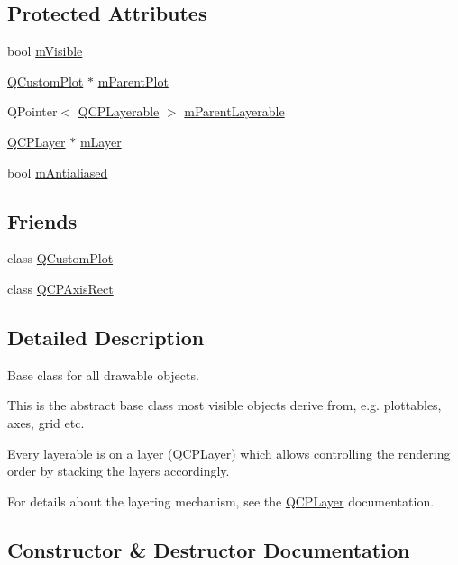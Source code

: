 \subsection*{Protected Attributes}
\begin{DoxyCompactItemize}
\item 
bool \hyperlink{classQCPLayerable_a62e3aed8427d6ce3ccf716f285106cb3}{m\+Visible}
\item 
\hyperlink{classQCustomPlot}{Q\+Custom\+Plot} $\ast$ \hyperlink{classQCPLayerable_aa2a528433e44db02b8aef23c1f9f90ed}{m\+Parent\+Plot}
\item 
Q\+Pointer$<$ \hyperlink{classQCPLayerable}{Q\+C\+P\+Layerable} $>$ \hyperlink{classQCPLayerable_a3291445a980053e2d17a21d15957624e}{m\+Parent\+Layerable}
\item 
\hyperlink{classQCPLayer}{Q\+C\+P\+Layer} $\ast$ \hyperlink{classQCPLayerable_aa38ec5891aff0f50b36fd63e9372a0cd}{m\+Layer}
\item 
bool \hyperlink{classQCPLayerable_a3ab45a4c76a3333ce42eb217a81733ec}{m\+Antialiased}
\end{DoxyCompactItemize}
\subsection*{Friends}
\begin{DoxyCompactItemize}
\item 
class \hyperlink{classQCPLayerable_a1cdf9df76adcfae45261690aa0ca2198}{Q\+Custom\+Plot}
\item 
class \hyperlink{classQCPLayerable_acbf20ecb140f66c5fd1bc64ae0762990}{Q\+C\+P\+Axis\+Rect}
\end{DoxyCompactItemize}


\subsection{Detailed Description}
Base class for all drawable objects. 

This is the abstract base class most visible objects derive from, e.\+g. plottables, axes, grid etc.

Every layerable is on a layer (\hyperlink{classQCPLayer}{Q\+C\+P\+Layer}) which allows controlling the rendering order by stacking the layers accordingly.

For details about the layering mechanism, see the \hyperlink{classQCPLayer}{Q\+C\+P\+Layer} documentation. 

\subsection{Constructor \& Destructor Documentation}
